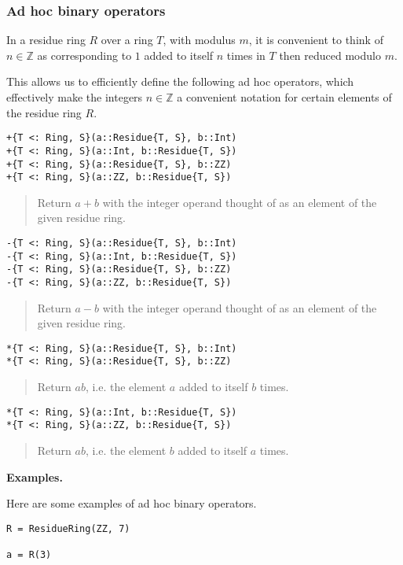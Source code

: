 \documentclass[a4paper,10pt]{article}
\newcommand{\Z}{\mathbb{Z}}
\newcommand{\desc}[1]{\vspace{-3mm}\begin{quote}#1\end{quote}}
\begin{document}
{{{\subsubsection{Ad hoc binary operators}

In a residue ring $R$ over a ring $T$, with modulus $m$, it is convenient
to think of $n \in \Z$ as corresponding to $1$ added to itself $n$ times
in $T$ then reduced modulo $m$.

This allows us to efficiently define the following ad hoc operators, which
effectively make the integers $n \in \Z$ a convenient notation for certain
elements of the residue ring $R$.

\begin{lstlisting}
+{T <: Ring, S}(a::Residue{T, S}, b::Int)
+{T <: Ring, S}(a::Int, b::Residue{T, S})
+{T <: Ring, S}(a::Residue{T, S}, b::ZZ)
+{T <: Ring, S}(a::ZZ, b::Residue{T, S})
\end{lstlisting}

\desc{Return $a + b$ with the integer operand thought of as an element of 
the given residue ring.}

\begin{lstlisting}
-{T <: Ring, S}(a::Residue{T, S}, b::Int)
-{T <: Ring, S}(a::Int, b::Residue{T, S})
-{T <: Ring, S}(a::Residue{T, S}, b::ZZ)
-{T <: Ring, S}(a::ZZ, b::Residue{T, S})
\end{lstlisting}

\desc{Return $a - b$ with the integer operand thought of as an element of 
the given residue ring.}

\begin{lstlisting}
*{T <: Ring, S}(a::Residue{T, S}, b::Int)
*{T <: Ring, S}(a::Residue{T, S}, b::ZZ)
\end{lstlisting}

\desc{Return $ab$, i.e. the element $a$ added to itself $b$ times.}

\begin{lstlisting}
*{T <: Ring, S}(a::Int, b::Residue{T, S})
*{T <: Ring, S}(a::ZZ, b::Residue{T, S})
\end{lstlisting}

\desc{Return $ab$, i.e. the element $b$ added to itself $a$ times.}

\textbf{Examples.}

Here are some examples of ad hoc binary operators.

\begin{lstlisting}
R = ResidueRing(ZZ, 7)

a = R(3)


\end{lstlisting}}}}
\end{document}
